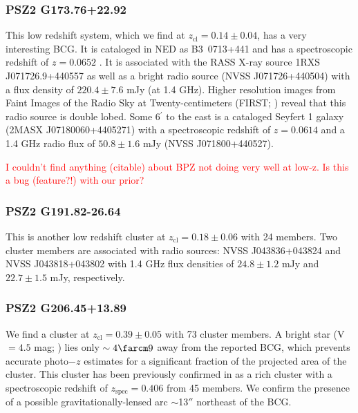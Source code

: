 \documentclass[apj, revtex4-1]{emulateapj}
\newcommand{\editorial}[1]{\textcolor{red}{#1}}
\begin{document}
\subsubsection{PSZ2 G173.76+22.92} %
This low redshift system, which we find at $z_\mathrm{cl} = 0.14 \pm 0.04$, has a very interesting BCG. It is cataloged in NED as \hbox{B3 0713+441} and has a spectroscopic redshift of $z=0.0652$ \citep{Bauer2000}. It is associated with the RASS X-ray source 1RXS J071726.9+440557 as well as a bright radio source (NVSS J071726+440504) with a flux density of $220.4\pm 7.6$ mJy (at 1.4 GHz). Higher resolution images from Faint Images of the Radio Sky at Twenty-centimeters (FIRST; \citealt{Becker1995}) reveal that this radio source is double lobed. Some 6$^\prime$ to the east is a cataloged Seyfert 1 galaxy (2MASX J07180060+4405271) with a spectroscopic redshift of $z=0.0614$ \citep{Michel1988} and a 1.4 GHz radio flux of $50.8 \pm 1.6 $ mJy (NVSS J071800+440527).

\editorial{I couldn't find anything (citable) about BPZ not doing very well at low-z. Is this a bug (feature?!) with our prior?}



\subsubsection{PSZ2 G191.82-26.64} %
This is another low redshift cluster at $z_\mathrm{cl} = 0.18 \pm 0.06$ with 24 members. Two cluster members are associated with radio sources: NVSS J043836+043824 and NVSS J043818+043802 with 1.4 GHz flux densities of $24.8 \pm 1.2$ mJy and $22.7 \pm 1.5$ mJy, respectively.

\subsubsection{PSZ2 G206.45+13.89} %
We find a cluster at $z_\mathrm{cl} = 0.39 \pm 0.05$ with 73 cluster members. A bright star (V $= 4.5$ mag; \citealt{Hog2000}) lies only $\sim4\farcm9$ away from the reported BCG, which prevents accurate photo$-z$ estimates for a significant fraction of the projected area of the cluster. This cluster has been previously confirmed in \citet{Barrena2018} as a rich cluster with a spectroscopic redshift of $z_\mathrm{spec} = 0.406$ from 45 members. We confirm the presence of a possible gravitationally-lensed arc $\sim$13$''$ northeast of the BCG.
\end{document}
